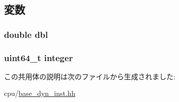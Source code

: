 \subsection{変数}
\hypertarget{unionBaseDynInst_1_1Result_a57291299e530453fdec37a931c728239}{
\subsubsection[{dbl}]{\setlength{\rightskip}{0pt plus 5cm}double {\bf dbl}}}
\label{unionBaseDynInst_1_1Result_a57291299e530453fdec37a931c728239}
\hypertarget{unionBaseDynInst_1_1Result_a88f9f5e1216d6aaa43434facecd25bc4}{
\subsubsection[{integer}]{\setlength{\rightskip}{0pt plus 5cm}uint64\_\-t {\bf integer}}}
\label{unionBaseDynInst_1_1Result_a88f9f5e1216d6aaa43434facecd25bc4}


この共用体の説明は次のファイルから生成されました:\begin{DoxyCompactItemize}
\item 
cpu/\hyperlink{base__dyn__inst_8hh}{base\_\-dyn\_\-inst.hh}\end{DoxyCompactItemize}
